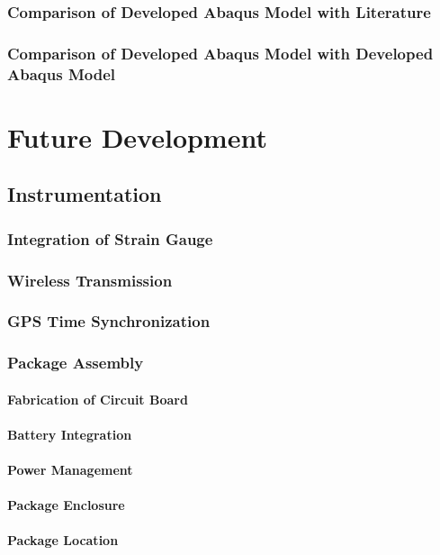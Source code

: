 \documentclass[12pt]{report}
\begin{document}
		\subsection{Comparison of Developed Abaqus Model with Literature}
		\subsection{Comparison of Developed Abaqus Model with Developed Abaqus Model}	
		
\chapter{Future Development}
	\section{Instrumentation}
		\subsection{Integration of Strain Gauge}
			
		\subsection{Wireless Transmission}
		\subsection{GPS Time Synchronization}
		\subsection{Package Assembly}
			\subsubsection{Fabrication of Circuit Board}
			\subsubsection{Battery Integration}
			\subsubsection{Power Management}
			\subsubsection{Package Enclosure}
				
			\subsubsection{Package Location}
				
\end{document}
